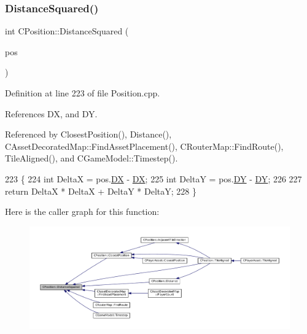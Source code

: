 \subsubsection{\texorpdfstring{Distance\+Squared()}{DistanceSquared()}}
{\footnotesize\ttfamily int C\+Position\+::\+Distance\+Squared (\begin{DoxyParamCaption}\item[{const \hyperlink{classCPosition}{C\+Position} \&}]{pos }\end{DoxyParamCaption})}



Definition at line 223 of file Position.\+cpp.



References DX, and DY.



Referenced by Closest\+Position(), Distance(), C\+Asset\+Decorated\+Map\+::\+Find\+Asset\+Placement(), C\+Router\+Map\+::\+Find\+Route(), Tile\+Aligned(), and C\+Game\+Model\+::\+Timestep().


\begin{DoxyCode}
223                                                   \{
224     \textcolor{keywordtype}{int} DeltaX = pos.\hyperlink{classCPosition_a28445f9b872169715919074d82044eda}{DX} - \hyperlink{classCPosition_a28445f9b872169715919074d82044eda}{DX};
225     \textcolor{keywordtype}{int} DeltaY = pos.\hyperlink{classCPosition_a84139c9e8eb547e7cf3cb851739943a4}{DY} - \hyperlink{classCPosition_a84139c9e8eb547e7cf3cb851739943a4}{DY};
226     
227     \textcolor{keywordflow}{return} DeltaX * DeltaX + DeltaY * DeltaY;
228 \}
\end{DoxyCode}
Here is the caller graph for this function\+:\nopagebreak
\begin{figure}[H]
\begin{center}
\leavevmode
\includegraphics[width=350pt]{classCPosition_acd96d507f44c0fdf13036ebc1a09e59c_icgraph}
\end{center}
\end{figure}
\hypertarget{classCPosition_a5e371060b1aa0d3d3c5df1e353e0e5fd}{}\label{classCPosition_a5e371060b1aa0d3d3c5df1e353e0e5fd} 
